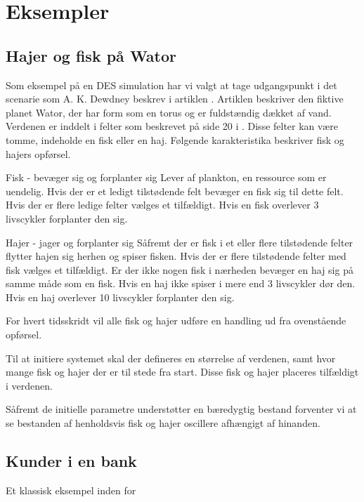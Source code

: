 \chapter{Eksempler}

\section{Hajer og fisk på Wator} Som eksempel på en DES simulation
har vi valgt at tage udgangspunkt i det scenarie som A. K. Dewdney
beskrev i artiklen . Artiklen beskriver den
fiktive planet Wator, der har form som en torus og er fuldstændig
dækket af vand. Verdenen er inddelt i felter som beskrevet på side
20 i . Disse felter kan være tomme, indeholde en
fisk eller en haj. Følgende karakteristika beskriver fisk og hajers
opførsel.


Fisk - bevæger sig og forplanter sig Lever af plankton, en ressource
som er uendelig. Hvis der er et ledigt tilstødende felt bevæger en
fisk sig til dette felt. Hvis der er flere ledige felter vælges et
tilfældigt. Hvis en fisk overlever 3 livscykler forplanter den sig.


Hajer - jager og forplanter sig Såfremt der er fisk i et eller flere
tilstødende felter flytter hajen sig herhen og spiser fisken. Hvis der
er flere tilstødende felter med fisk vælges et tilfældigt. Er der
ikke nogen fisk i nærheden bevæger en haj sig på samme måde som en
fisk. Hvis en haj ikke spiser i mere end 3 livscykler dør den. Hvis en
haj overlever 10 livscykler forplanter den sig.

For hvert tidsskridt vil alle fisk og hajer udføre en handling ud fra
ovenstående opførsel.

Til at initiere systemet skal der defineres en størrelse af verdenen,
samt hvor mange fisk og hajer der er til stede fra start. Disse fisk og
hajer placeres tilfældigt i verdenen.

Såfremt de initielle parametre understøtter en bæredygtig bestand
forventer vi at se bestanden af henholdsvis fisk og hajer oscillere
afhængigt af hinanden.

\section{Kunder i en bank} Et klassisk eksempel inden for \des
